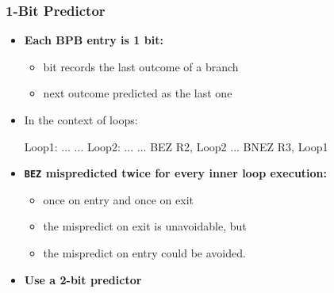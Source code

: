\documentclass{beamer}
\newcommand{\emp}[1]{\textcolor{DikuRed}{ #1}}
\newcommand{\emphh}[1]{\textcolor{CosGreen}{ #1}}
\begin{document}
\begin{frame}[fragile,t]
\frametitle{1-Bit Predictor}

\begin{itemize}
    \item \emp{\bf Each BPB entry is 1 bit:}
        \begin{itemize}
            \item bit records the last outcome of a branch
            \item next outcome predicted as the last one
        \end{itemize}\medskip
    \item In the context of loops:
\begin{colorcode}
    \emp{Loop1:} ...
           ...
           \emphh{Loop2:} ...
                  ...
                  BEZ R2, \emphh{Loop2}
           ...
           BNEZ R3, \emp{Loop1}
\end{colorcode}
    \item \emp{\bf {\tt BEZ} mispredicted twice for every inner loop execution:}
        \begin{itemize}
            \item once on entry and once on exit
            \item the mispredict on exit is unavoidable, but
            \item the mispredict on entry could be avoided.
        \end{itemize}\pause\medskip

    \item \emp{\bf Use a 2-bit predictor}
\end{itemize}
\end{frame}
\end{document}
